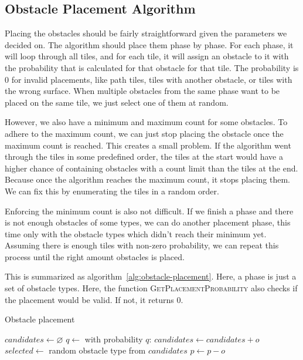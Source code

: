 \subsection{Obstacle Placement Algorithm}

Placing the obstacles should be fairly straightforward given the parameters we decided on.
The algorithm should place them phase by phase.
For each phase, it will loop through all tiles, and for each tile, it will assign an obstacle to it with the probability that is calculated for that obstacle for that tile.
The probability is 0 for invalid placements, like path tiles, tiles with another obstacle, or tiles with the wrong surface.
When multiple obstacles from the same phase want to be placed on the same tile, we just select one of them at random.

However, we also have a minimum and maximum count for some obstacles.
To adhere to the maximum count, we can just stop placing the obstacle once the maximum count is reached.
This creates a small problem.
If the algorithm went through the tiles in some predefined order, the tiles at the start would have a higher chance of containing obstacles with a count limit than the tiles at the end.
Because once the algorithm reaches the maximum count, it stops placing them.
We can fix this by enumerating the tiles in a random order.

Enforcing the minimum count is also not difficult.
If we finish a phase and there is not enough obstacles of some types, we can do another placement phase, this time only with the obstacle types which didn't reach their minimum yet.
Assuming there is enough tiles with non-zero probability, we can repeat this process until the right amount obstacles is placed.

This is summarized as algorithm~\ref{alg:obstacle-placement}.
Here, a phase is just a set of obstacle types.
Here, the function \textsc{GetPlacementProbability} also checks if the placement would be valid.
If not, it returns 0.

\begin{algorithm}[H]
    \caption{Obstacle placement}
    \label{alg:obstacle-placement}
    \begin{algorithmic}[1]
        \Statex
        \State $candidates \gets \varnothing$
        \State $q \gets$ 
        \State with probability $q$: $candidates \gets candidates + o$
        \EndFor
        \Statex
        \State $selected \gets$ random obstacle type from $candidates$
        \State {}
        \EndIf
        \EndFor
        \Statex
        \State $p \gets p - o$
        \EndIf
        \EndFor
        \Statex
        \EndWhile
        \EndFor
        \Statex
    \end{algorithmic}
\end{algorithm}

